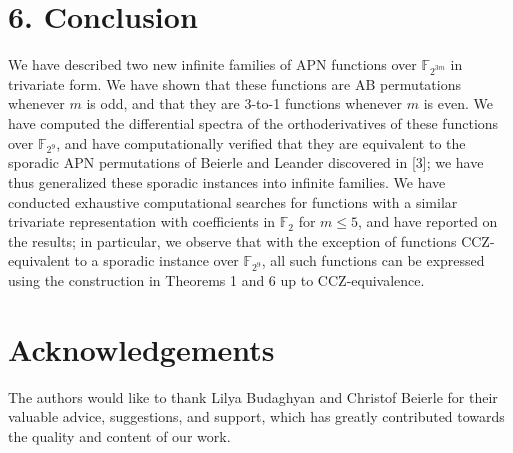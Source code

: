 \documentclass[10pt]{article}
\begin{document}
\section*{6. Conclusion}
We have described two new infinite families of APN functions over $\mathbb{F}_{2^{3 m}}$ in trivariate form. We have shown that these functions are AB permutations whenever $m$ is odd, and that they are 3-to-1 functions whenever $m$ is even. We have computed the differential spectra of the orthoderivatives of these functions over $\mathbb{F}_{2^{9}}$, and have computationally verified that they are equivalent to the sporadic APN permutations of Beierle and Leander discovered in [3]; we have thus generalized these sporadic instances into infinite families. We have conducted exhaustive computational searches for functions with a similar trivariate representation with coefficients in $\mathbb{F}_{2}$ for $m \leq 5$, and have reported on the results; in particular, we observe that with the exception of functions CCZ-equivalent to a sporadic instance over $\mathbb{F}_{2^{9}}$, all such functions can be expressed using the construction in Theorems 1 and 6 up to CCZ-equivalence.

\section*{Acknowledgements}
The authors would like to thank Lilya Budaghyan and Christof Beierle for their valuable advice, suggestions, and support, which has greatly contributed towards the quality and content of our work.
\end{document}
